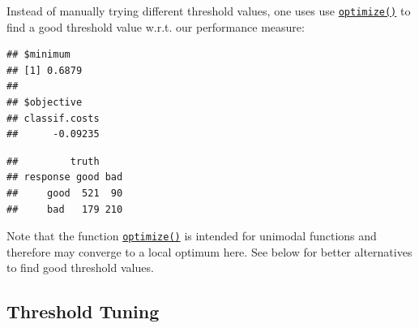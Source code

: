 \documentclass[
]{scrbook}
\newenvironment{Shaded}{\begin{snugshade}}{\end{snugshade}}
\newcommand{\CommentTok}[1]{\textcolor[rgb]{0.56,0.35,0.01}{\textit{#1}}}
\newcommand{\ControlFlowTok}[1]{\textcolor[rgb]{0.13,0.29,0.53}{\textbf{#1}}}
\newcommand{\DecValTok}[1]{\textcolor[rgb]{0.00,0.00,0.81}{#1}}
\newcommand{\FloatTok}[1]{\textcolor[rgb]{0.00,0.00,0.81}{#1}}
\newcommand{\FunctionTok}[1]{\textcolor[rgb]{0.00,0.00,0.00}{#1}}
\newcommand{\NormalTok}[1]{#1}
\newcommand{\OtherTok}[1]{\textcolor[rgb]{0.56,0.35,0.01}{#1}}
\newcommand{\SpecialCharTok}[1]{\textcolor[rgb]{0.00,0.00,0.00}{#1}}
\renewenvironment{Shaded} {\begin{snugshade}\small} {\end{snugshade}}
\begin{document}
Instead of manually trying different threshold values, one uses use \href{https://www.rdocumentation.org/packages/stats/topics/optimize}{\texttt{optimize()}} to find a good threshold value w.r.t. our performance measure:

\begin{Shaded}
\end{Shaded}

\begin{verbatim}
## $minimum
## [1] 0.6879
## 
## $objective
## classif.costs 
##      -0.09235
\end{verbatim}

\begin{Shaded}
\end{Shaded}

\begin{verbatim}
##         truth
## response good bad
##     good  521  90
##     bad   179 210
\end{verbatim}

Note that the function \href{https://www.rdocumentation.org/packages/stats/topics/optimize}{\texttt{optimize()}} is intended for unimodal functions and therefore may converge to a local optimum here.
See below for better alternatives to find good threshold values.

\hypertarget{threshold-tuning-1}{%
\subsection{Threshold Tuning}\label{threshold-tuning-1}}
\end{document}
